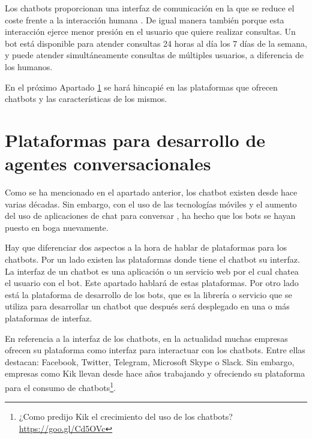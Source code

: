 Los chatbots proporcionan una interfaz de comunicación en la que se reduce el coste frente a la interacción humana \cite{Dans2016}. De igual manera también porque esta interacción ejerce menor presión en el usuario que quiere realizar consultas. Un bot está disponible para atender consultas 24 horas al día los 7 días de la semana, y puede atender simultáneamente consultas de múltiples usuarios, a diferencia de los humanos.

En el próximo Apartado \ref{sec:PlataformasChatbot} se hará hincapié en las plataformas que ofrecen chatbots y las características de los mismos.

\section{Plataformas para desarrollo de agentes conversacionales}
\label{sec:PlataformasChatbot}

Como se ha mencionado en el apartado anterior, los chatbot existen desde hace varias décadas. Sin embargo, con el uso de las tecnologías móviles y el aumento del uso de aplicaciones de chat para conversar \cite{Montag2015}, ha hecho que los bots se hayan puesto en boga nuevamente.

Hay que diferenciar dos aspectos a la hora de hablar de plataformas para los chatbots. Por un lado existen las plataformas donde tiene el chatbot su interfaz. La interfaz de un chatbot es una aplicación o un servicio web por el cual chatea el usuario con el bot. Este apartado hablará de estas plataformas. Por otro lado está la plataforma de desarrollo de los bots, que es la librería o servicio que se utiliza para desarrollar un chatbot que después será desplegado en una o más plataformas de interfaz.

En referencia a la interfaz de los chatbots, en la actualidad muchas empresas ofrecen su plataforma como interfaz para interactuar con los chatbots. Entre ellas destacan: Facebook, Twitter, Telegram, Microsoft Skype o Slack. Sin embargo, empresas como Kik llevan desde hace años trabajando y ofreciendo su plataforma para el consumo de chatbots\footnote{¿Como predijo Kik el crecimiento del uso de los chatbots? \url{https://goo.gl/Cd5OVc}}.

